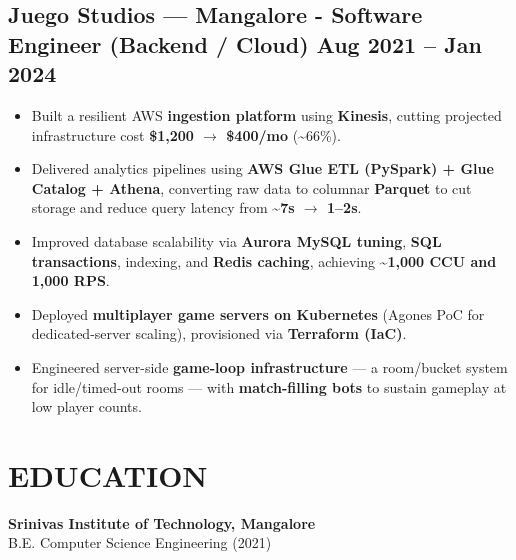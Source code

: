 \documentclass[a4paper,10pt]{article}
\begin{document}
\subsection*{{\color{accent}Juego Studios --- Mangalore} \textnormal{-} Software Engineer (Backend / Cloud) \textbar{} Aug 2021 -- Jan 2024}
\begin{itemize}
  \item Built a resilient AWS \textbf{ingestion platform} using \textbf{Kinesis}, cutting projected infrastructure cost \textbf{\$1,200 $\rightarrow$ \$400/mo} (\textasciitilde{}66\%).
  \item Delivered analytics pipelines using \textbf{AWS Glue ETL (PySpark) + Glue Catalog + Athena}, converting raw data to columnar \textbf{Parquet} to cut storage and reduce query latency from \textbf{\textasciitilde{}7s $\rightarrow$ 1--2s}.
  \item Improved database scalability via \textbf{Aurora MySQL tuning}, \textbf{SQL transactions}, indexing, and \textbf{Redis caching}, achieving \textbf{\textasciitilde{}1,000 CCU and 1,000 RPS}.
  \item Deployed \textbf{multiplayer game servers on Kubernetes} (Agones PoC for dedicated-server scaling), provisioned via \textbf{Terraform (IaC)}.
  \item Engineered server-side \textbf{game-loop infrastructure} --- a room/bucket system for idle/timed-out rooms --- with \textbf{match-filling bots} to sustain gameplay at low player counts.
\end{itemize}

\section*{EDUCATION}
\textbf{Srinivas Institute of Technology, Mangalore}\\
B.E. Computer Science Engineering (2021)
\end{document}
